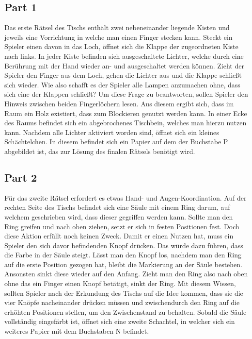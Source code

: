 \subsection{Part 1}
Das erste Rätsel des Tischs enthält zwei nebeneinander liegende Kisten und jeweils eine Vorrichtung in welche man einen Finger stecken kann. Steckt ein Spieler einen davon in das Loch, öffnet sich die Klappe der zugeordneten Kiste nach links. In jeder Kiste befinden sich ausgeschaltete Lichter, welche durch eine Berührung mit der Hand wieder an- und ausgeschaltet werden können. Zieht der Spieler den Finger aus dem Loch, gehen die Lichter aus und die Klappe schließt sich wieder. Wie also schafft es der Spieler alle Lampen anzumachen ohne, dass sich eine der Klappen schließt? Um diese Frage zu beantworten, sollen Spieler den Hinweis zwischen beiden Fingerlöchern lesen. Aus diesem ergibt sich, dass im Raum ein Holz existiert, dass zum Blockieren genutzt werden kann. In einer Ecke des Raums befindet sich ein abgebrochenes Tischbein, welches man hierzu nutzen kann. Nachdem alle Lichter aktiviert worden sind, öffnet sich ein kleines Schächtelchen. In diesem befindet sich ein Papier auf dem der Buchstabe P abgebildet ist, das zur Lösung des finalen Rätsels benötigt wird.
\subsection{Part 2}
Für das zweite Rätsel erfordert es etwas Hand- und Augen-Koordination. Auf der rechten Seite des Tischs befindet sich eine Säule mit einem Ring darum, auf welchem geschrieben wird, dass dieser gegriffen werden kann. Sollte man den Ring greifen und nach oben ziehen, setzt er sich in festen Positionen fest. Doch diese Aktion erfüllt noch keinen Zweck. Damit er einen Nutzen hat, muss ein Spieler den sich davor befindenden Knopf drücken. Das würde dazu führen, dass die Farbe in der Säule steigt. Lässt man den Knopf los, nachdem man den Ring auf die erste Position gezogen hat, bleibt die Markierung an der Säule bestehen. Ansonsten sinkt diese wieder auf den Anfang. Zieht man den Ring also nach oben ohne das ein Finger einen Knopf betätigt, sinkt der Ring. Mit diesem Wissen, sollten Spieler nach der Erkundung des Tischs auf die Idee kommen, dass sie die vier Knöpfe nacheinander drücken müssen und zwischendurch den Ring auf die erhöhten Positionen stellen, um den Zwischenstand zu behalten. Sobald die Säule vollständig eingefärbt ist, öffnet sich eine zweite Schachtel, in welcher sich ein weiteres Papier mit dem Buchstaben N befindet.
